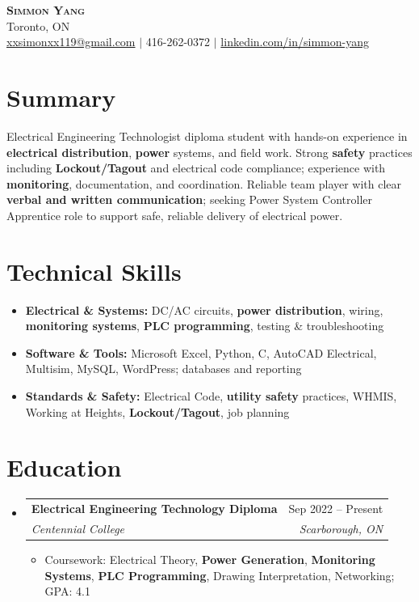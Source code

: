 \documentclass[letterpaper,11pt]{article}
\makeatletter
\newcommand{\resumeItem}[1]{\item\small{{#1 \vspace{-2pt}}}}
\newcommand{\resumeSubheading}[4]{
  \vspace{-2pt}\item
    \begin{tabular*}{0.97\textwidth}[t]{l@{\extracolsep{\fill}}r}
      \textbf{#1} & #2 \\
      \textit{\small #3} & \textit{\small #4} \\
    \end{tabular*}\vspace{-7pt}
}
\newcommand{\resumeSubHeadingListStart}{\begin{itemize}[leftmargin=0.15in, label={}]}
\newcommand{\resumeSubHeadingListEnd}{\end{itemize}}
\newcommand{\resumeItemListStart}{\begin{itemize}}
\newcommand{\resumeItemListEnd}{\end{itemize}\vspace{-5pt}}
\makeatother
\begin{document}
\begin{center}
    \textbf{\Huge \scshape Simmon Yang} \\ \vspace{1pt}
    Toronto, ON \\ 
    \href{mailto:xxsimonxx119@gmail.com}{xxsimonxx119@gmail.com} $|$ 416-262-0372 $|$ 
    \href{https://www.linkedin.com/in/simmon-yang/}{linkedin.com/in/simmon-yang}
\end{center}

\section{Summary}
Electrical Engineering Technologist diploma student with hands-on experience in \textbf{electrical distribution}, \textbf{power} systems, and field work. Strong \textbf{safety} practices including \textbf{Lockout/Tagout} and electrical code compliance; experience with \textbf{monitoring}, documentation, and coordination. Reliable team player with clear \textbf{verbal and written communication}; seeking Power System Controller Apprentice role to support safe, reliable delivery of electrical power.

\section{Technical Skills}
\begin{itemize}[leftmargin=0.15in]
  \item \textbf{Electrical \& Systems:} DC/AC circuits, \textbf{power distribution}, wiring, \textbf{monitoring systems}, \textbf{PLC programming}, testing \& troubleshooting
  \item \textbf{Software \& Tools:} Microsoft Excel, Python, C, AutoCAD Electrical, Multisim, MySQL, WordPress; databases and reporting
  \item \textbf{Standards \& Safety:} Electrical Code, \textbf{utility safety} practices, WHMIS, Working at Heights, \textbf{Lockout/Tagout}, job planning
\end{itemize}

\section{Education}
\resumeSubHeadingListStart
\resumeSubheading
  {Electrical Engineering Technology Diploma}{Sep 2022 -- Present}
  {Centennial College}{Scarborough, ON}
\resumeItemListStart
  \resumeItem{Coursework: Electrical Theory, \textbf{Power Generation}, \textbf{Monitoring Systems}, \textbf{PLC Programming}, Drawing Interpretation, Networking; GPA: 4.1}
\resumeItemListEnd
\resumeSubHeadingListEnd
\end{document}
